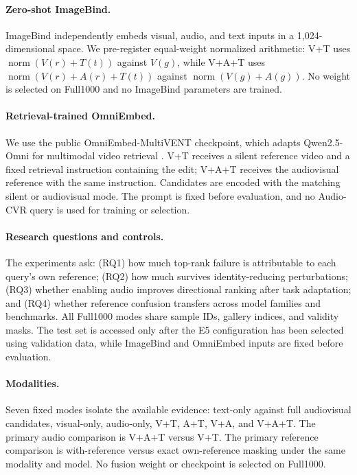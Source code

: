 \documentclass[letterpaper]{article}
\begin{document}
\paragraph{Zero-shot ImageBind.}
ImageBind independently embeds visual, audio, and text inputs in a 1,024-dimensional space.
We pre-register equal-weight normalized arithmetic: V+T uses
$\operatorname{norm}(V(r)+T(t))$ against $V(g)$, while V+A+T uses
$\operatorname{norm}(V(r)+A(r)+T(t))$ against
$\operatorname{norm}(V(g)+A(g))$.
No weight is selected on Full1000 and no ImageBind parameters are trained.

\paragraph{Retrieval-trained OmniEmbed.}
We use the public OmniEmbed-MultiVENT checkpoint, which adapts Qwen2.5-Omni for multimodal video retrieval \cite{xu2025qwen25omni,wu2025omniembed}.
V+T receives a silent reference video and a fixed retrieval instruction containing the edit; V+A+T receives the audiovisual reference with the same instruction.
Candidates are encoded with the matching silent or audiovisual mode.
The prompt is fixed before evaluation, and no Audio-CVR query is used for training or selection.

\paragraph{Research questions and controls.}
The experiments ask: (RQ1) how much top-rank failure is attributable to each query's own reference; (RQ2) how much survives identity-reducing perturbations; (RQ3) whether enabling audio improves directional ranking after task adaptation; and (RQ4) whether reference confusion transfers across model families and benchmarks.
All Full1000 modes share sample IDs, gallery indices, and validity masks.
The test set is accessed only after the E5 configuration has been selected using validation data, while ImageBind and OmniEmbed inputs are fixed before evaluation.

\paragraph{Modalities.}
Seven fixed modes isolate the available evidence: text-only against full audiovisual candidates, visual-only, audio-only, V+T, A+T, V+A, and V+A+T.
The primary audio comparison is V+A+T versus V+T.
The primary reference comparison is with-reference versus exact own-reference masking under the same modality and model.
No fusion weight or checkpoint is selected on Full1000.
\end{document}
